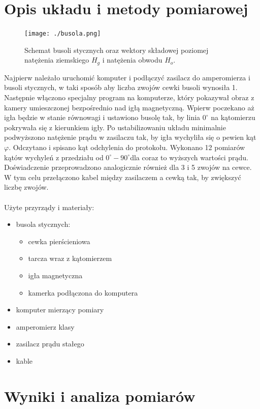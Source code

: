 \documentclass[a4paper,10pt]{article}
\begin{document}
\section{Opis układu i metody pomiarowej}
\begin{figure}[H]
\centering
  \texttt{[image: ./busola.png]}
  \caption{Schemat busoli stycznych oraz wektory składowej poziomej natężenia ziemskiego $H_g$ i natężenia obwodu $H_o$.}
  \label{}
\end{figure}
Najpierw należało uruchomić komputer i podłączyć zasilacz do amperomierza i busoli stycznych, w taki sposób aby liczba zwojów cewki busoli wynosiła 1. Następnie włączono specjalny program na komputerze, który pokazywał obraz z kamery umieszczonej bezpośrednio nad igłą magnetyczną. Wpierw poczekano aż igła będzie w stanie równowagi i ustawiono busolę tak, by linia $0^\circ$ na kątomierzu pokrywała się z kierunkiem igły. Po ustabilizowaniu układu minimalnie podwyższono natężenie prądu w zasilaczu tak, by igła wychyliła się o pewien kąt $\varphi$. Odczytano i spisano kąt odchylenia do protokołu. Wykonano 12 pomiarów kątów wychyleń z przedziału od $0^\circ - 90^\circ$dla coraz to wyższych wartości prądu. Doświadczenie przeprowadzono analogicznie również dla 3 i 5 zwojów na cewce. W tym celu przełączono kabel między zasilaczem a cewką tak, by zwiększyć liczbę zwojów. 
\\
\\Użyte przyrządy i materiały:
\begin{itemize}
  \item busola stycznych:
    \begin{itemize}
      \item cewka pierścieniowa
      \item tarcza wraz z kątomierzem
      \item igła magnetyczna
      \item kamerka podłączona do komputera
    \end{itemize}
  \item komputer mierzący pomiary
  \item amperomierz klasy %
  \item zasilacz prądu stałego
  \item kable
\end{itemize}
\section{Wyniki i analiza pomiarów}
\end{document}
